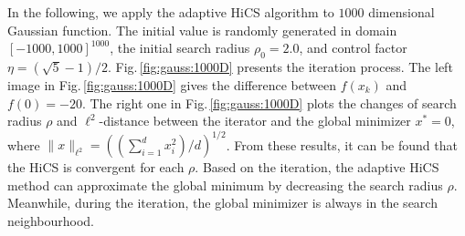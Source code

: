 In the following, we apply the adaptive HiCS algorithm to $1000$ dimensional
Gaussian function. The initial value is randomly generated in
domain $[-1000,1000]^{1000}$, the initial search radius $\rho_0 = 2.0$,
and control factor $\eta=(\sqrt{5}-1)/2$. 
Fig.\,\ref{fig:gauss:1000D} presents the iteration process.
The left image in Fig.\,\ref{fig:gauss:1000D} gives
the difference between $f(x_k)$ and $f(0)=-20$. 
The right one in Fig.\,\ref{fig:gauss:1000D} 
plots the changes of search radius $\rho$ and $\ell^2$-distance between
the iterator and the global minimizer $x^*=0$, where $\|x\|_{\ell^2}=\left(
(\sum_{i=1}^d x_i^2) / d\right)^{1/2}$.
From these results, it can be found that the HiCS is convergent
for each $\rho$. Based on the iteration, the adaptive HiCS method
can approximate the global minimum by decreasing the search radius $\rho$. 
Meanwhile, during the iteration, the global minimizer is always in the
search neighbourhood. 
